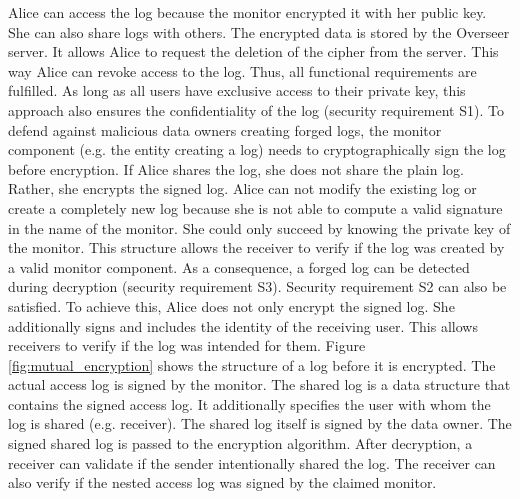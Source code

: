 \documentclass[../main.tex]{subfiles}
\begin{document}
Alice can access the log because the monitor encrypted it with her public key.
She can also share logs with others.
The encrypted data is stored by the Overseer server.
It allows Alice to request the deletion of the cipher from the server.
This way Alice can revoke access to the log.
Thus, all functional requirements are fulfilled.
As long as all users have exclusive access to their private key, this approach also ensures the confidentiality of the log (security requirement S1).
To defend against malicious data owners creating forged logs, the monitor component (e.g. the entity creating a log) needs to cryptographically sign the log before encryption.
If Alice shares the log, she does not share the plain log.
Rather, she encrypts the signed log.
Alice can not modify the existing log or create a completely new log because she is not able to compute a valid signature in the name of the monitor.
She could only succeed by knowing the private key of the monitor.
This structure allows the receiver to verify if the log was created by a valid monitor component.
As a consequence, a forged log can be detected during decryption (security requirement S3).
Security requirement S2 can also be satisfied.
To achieve this, Alice does not only encrypt the signed log.
She additionally signs and includes the identity of the receiving user.
This allows receivers to verify if the log was intended for them.
Figure \ref{fig:mutual_encryption} shows the structure of a log before it is encrypted.
The actual access log is signed by the monitor.
The shared log is a data structure that contains the signed access log.
It additionally specifies the user with whom the log is shared (e.g. receiver).
The shared log itself is signed by the data owner.
The signed shared log is passed to the encryption algorithm.
After decryption, a receiver can validate if the sender intentionally shared the log.
The receiver can also verify if the nested access log was signed by the claimed monitor.
\end{document}

